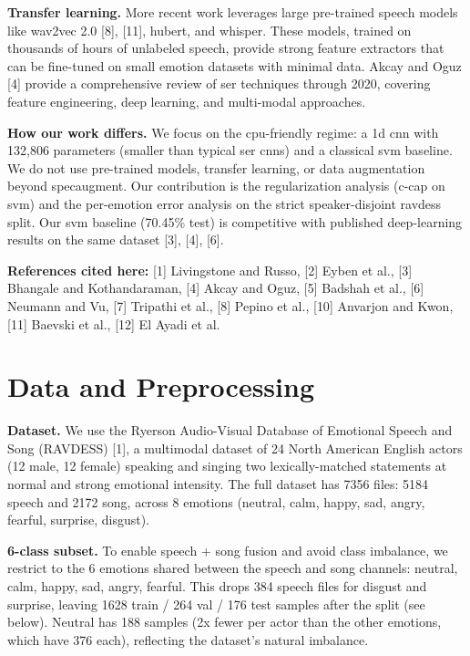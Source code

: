 \documentclass[conference]{IEEEtran}
\begin{document}
\textbf{Transfer learning.} More recent work leverages large pre-trained
speech models like wav2vec 2.0 {[}8{]}, {[}11{]}, hubert, and whisper. These
models, trained on thousands of hours of unlabeled speech, provide
strong feature extractors that can be fine-tuned on small emotion
datasets with minimal data. Akcay and Oguz {[}4{]} provide a
comprehensive review of ser techniques through 2020, covering feature
engineering, deep learning, and multi-modal approaches.

\textbf{How our work differs.} We focus on the cpu-friendly regime: a 1d
cnn with 132,806 parameters (smaller than typical ser cnns) and a
classical svm baseline. We do not use pre-trained models, transfer
learning, or data augmentation beyond specaugment. Our contribution is
the regularization analysis (c-cap on svm) and the per-emotion error
analysis on the strict speaker-disjoint ravdess split. Our svm baseline
(70.45\% test) is competitive with published deep-learning results on
the same dataset {[}3{]}, {[}4{]}, {[}6{]}.

\textbf{References cited here:} {[}1{]} Livingstone and Russo, {[}2{]}
Eyben et al., {[}3{]} Bhangale and Kothandaraman, {[}4{]} Akcay and
Oguz, {[}5{]} Badshah et al., {[}6{]} Neumann and Vu, {[}7{]} Tripathi
et al., {[}8{]} Pepino et al.,
{[}10{]} Anvarjon and Kwon, {[}11{]} Baevski et al.,
{[}12{]} El Ayadi et al.


\section{Data and Preprocessing}\label{data-and-preprocessing}

\textbf{Dataset.} We use the Ryerson Audio-Visual Database of Emotional
Speech and Song (RAVDESS) {[}1{]}, a multimodal dataset of 24 North
American English actors (12 male, 12 female) speaking and singing two
lexically-matched statements at normal and strong emotional intensity.
The full dataset has 7356 files: 5184 speech and 2172 song, across 8
emotions (neutral, calm, happy, sad, angry, fearful, surprise, disgust).

\textbf{6-class subset.} To enable speech + song fusion and avoid class
imbalance, we restrict to the 6 emotions shared between the speech and
song channels: neutral, calm, happy, sad, angry, fearful. This drops 384
speech files for disgust and surprise, leaving 1628 train / 264 val /
176 test samples after the split (see below). Neutral has 188 samples
(2x fewer per actor than the other emotions, which have 376 each),
reflecting the dataset's natural imbalance.
\end{document}
